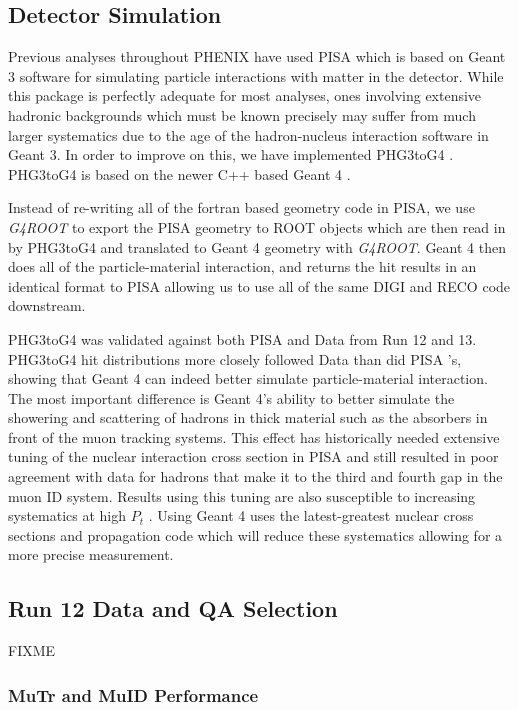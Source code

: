 \documentclass[12pt]{article}
\newcommand{\PISA}{\textsf{PISA} }
\newcommand{\pt}{$P_{t}$ }
\begin{document}
\subsection{Detector Simulation}
\label{sec:DetSim}
Previous analyses throughout PHENIX have used \PISA which is based on Geant 3 software for simulating particle interactions
with matter in the detector.  While this package is perfectly adequate for most analyses, ones involving extensive hadronic backgrounds
which must be known precisely may suffer from much larger systematics due to the age of the hadron-nucleus interaction software in 
Geant 3.  In order to improve on this, we have implemented PHG3toG4 \cite{ref:PHG3toG4}.  PHG3toG4 is based on the newer C++ based Geant 4 \cite{ref:Geant4}.

Instead of re-writing all of the fortran based geometry code in PISA, we use {\it G4ROOT} \cite{ref:G4ROOT} to export the \PISA geometry to ROOT objects which 
are then read in by PHG3toG4 and translated to Geant 4 geometry with {\it G4ROOT}.  Geant 4 then does all of the particle-material interaction,
and returns the hit results in an identical format to \PISA allowing us to use all of the same DIGI and RECO code downstream. 

PHG3toG4 was validated against both \PISA and Data from Run 12 and 13.  PHG3toG4 hit distributions more closely followed Data than did \PISA's, 
showing that Geant 4 can indeed better simulate particle-material interaction.  The most important difference is Geant 4's ability to better simulate the
showering and scattering of hadrons in thick material such as the absorbers in front of the muon tracking systems.  This effect has historically needed extensive
tuning of the nuclear interaction cross section in \PISA and still resulted in poor agreement with data for hadrons that make it to the third and fourth gap 
in the muon ID system.  Results using this tuning are also susceptible to increasing systematics at high \pt.  Using Geant 4 uses the latest-greatest
nuclear cross sections and propagation code which will reduce these systematics allowing for a more precise measurement.


\subsection{Run 12 Data and QA Selection}
{\color{red}FIXME}

\subsubsection{MuTr and MuID Performance}
\end{document}
